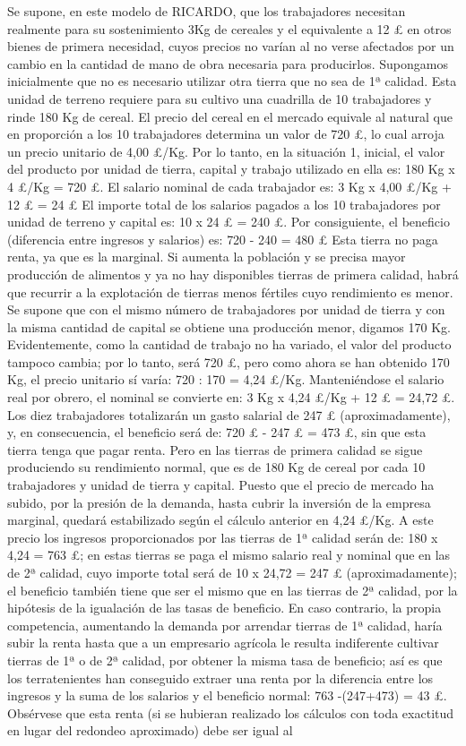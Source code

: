 \documentclass[10pt,a4paper]{article}
\begin{document}
{    Se supone, en este modelo de RICARDO, que los trabajadores necesitan realmente para su sostenimiento 3Kg de cereales y el equivalente a 12 £ en otros bienes de primera necesidad, cuyos precios no varían al no verse afectados por un cambio en la cantidad de mano de obra necesaria para producirlos. Supongamos inicialmente que no es necesario utilizar otra tierra que no sea de 1ª calidad. Esta unidad de terreno requiere para su cultivo una cuadrilla de 10 trabajadores y rinde 180 Kg de cereal. El precio del cereal en el mercado equivale al natural que en proporción a los 10 trabajadores determina un valor de 720 £, lo cual arroja un precio unitario de 4,00 £/Kg. Por lo tanto, en la situación 1, inicial, el valor del producto por unidad de tierra, capital y trabajo utilizado en ella es: 180 Kg x 4 £/Kg = 720 £. El salario nominal de cada trabajador es: 3 Kg x 4,00 £/Kg + 12 £ = 24 £ El importe total de los salarios pagados a los 10 trabajadores por unidad de terreno y capital es: 10 x 24 £ = 240 £. Por consiguiente, el beneficio (diferencia entre ingresos y salarios) es: 720 - 240 = 480 £ Esta tierra no paga renta, ya que es la marginal. Si aumenta la población y se precisa mayor producción de alimentos y ya no hay disponibles tierras de primera calidad, habrá que recurrir a la explotación de tierras menos fértiles cuyo rendimiento es menor. Se supone que con el mismo número de trabajadores por unidad de tierra y con la misma cantidad de capital se obtiene una producción menor, digamos 170 Kg. Evidentemente, como la cantidad de trabajo no ha variado, el valor del producto tampoco cambia; por lo tanto, será 720 £, pero como ahora se han obtenido 170 Kg, el precio unitario sí varía: 720 : 170 = 4,24 £/Kg. Manteniéndose el salario real por obrero, el nominal se convierte en: 3 Kg x 4,24 £/Kg + 12 £ = 24,72 £. Los diez trabajadores totalizarán un gasto salarial de 247 £ (aproximadamente), y, en consecuencia, el beneficio será de: 720 £ - 247 £ = 473 £, sin que esta tierra tenga que pagar renta. Pero en las tierras de primera calidad se sigue produciendo su rendimiento normal, que es de 180 Kg de cereal por cada 10 trabajadores y unidad de tierra y capital. Puesto que el precio de mercado ha subido, por la presión de la demanda, hasta cubrir la inversión de la empresa marginal, quedará estabilizado según el cálculo anterior en 4,24 £/Kg. A este precio los ingresos proporcionados por las tierras de 1ª calidad serán de: 180 x 4,24 = 763 £; en estas tierras se paga el mismo salario real y nominal que en las de 2ª calidad, cuyo importe total será de 10 x 24,72 = 247 £ (aproximadamente); el beneficio también tiene que ser el mismo que en las tierras de 2ª calidad, por la hipótesis de la igualación de las tasas de beneficio. En caso contrario, la propia competencia, aumentando la demanda por arrendar tierras de 1ª calidad, haría subir la renta hasta que a un empresario agrícola le resulta indiferente cultivar tierras de 1ª o de 2ª calidad, por obtener la misma tasa de beneficio; así es que los terratenientes han conseguido extraer una renta por la diferencia entre los ingresos y la suma de los salarios y el beneficio normal: 763 -(247+473) = 43 £. Obsérvese que esta renta (si se hubieran realizado los cálculos con toda exactitud en lugar del redondeo aproximado) debe ser igual al }
\end{document}
